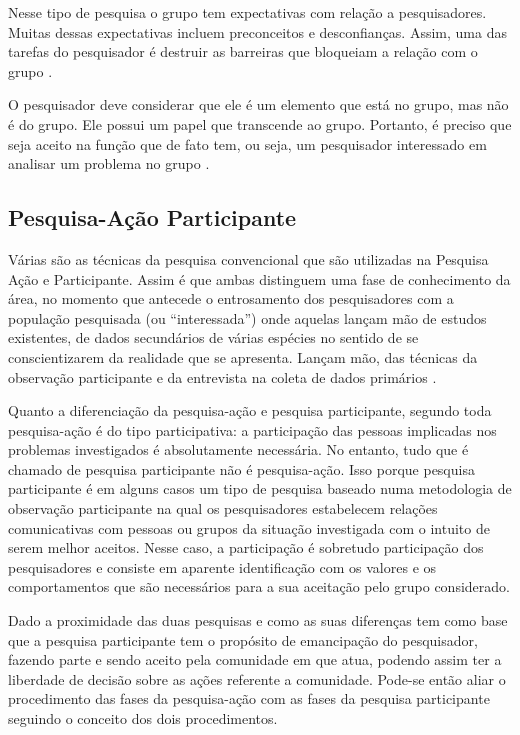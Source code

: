 Nesse tipo de pesquisa o grupo tem expectativas com relação a pesquisadores. Muitas dessas expectativas incluem preconceitos e desconfianças. Assim, uma das tarefas do pesquisador é destruir as barreiras que bloqueiam a relação com o grupo \cite{costaSantosTrevisan}.

O pesquisador deve considerar que ele é um elemento que está no grupo, mas não é do grupo. Ele possui um papel que transcende ao grupo. Portanto, é preciso que seja aceito na função que de fato tem, ou seja, um pesquisador interessado em analisar um problema no grupo \cite{costaSantosTrevisan}.

\subsection{Pesquisa-Ação Participante}

Várias são as técnicas da pesquisa convencional que são utilizadas na Pesquisa Ação e Participante. Assim é que ambas distinguem uma fase de conhecimento da área, no momento que antecede o entrosamento dos pesquisadores com a população pesquisada (ou “interessada”) onde aquelas lançam mão de estudos existentes, de dados secundários de várias espécies no sentido de se conscientizarem da realidade que se apresenta. Lançam mão, das técnicas da observação participante e da entrevista na coleta de dados primários \cite{costaSantosTrevisan}.

Quanto a diferenciação da pesquisa-ação e pesquisa participante, segundo  toda pesquisa-ação é do tipo participativa: a participação das pessoas implicadas nos problemas investigados é absolutamente necessária. No entanto, tudo que é chamado de pesquisa participante não é pesquisa-ação. Isso porque pesquisa participante é em alguns casos um tipo de pesquisa baseado numa metodologia de observação participante na qual os pesquisadores estabelecem relações comunicativas com pessoas ou grupos da situação investigada com o intuito de serem melhor aceitos. Nesse caso, a participação é sobretudo participação dos pesquisadores e consiste em aparente identificação com os valores e os comportamentos que são necessários para a sua aceitação pelo grupo considerado.

Dado a proximidade das duas pesquisas e como as suas diferenças tem como base que a pesquisa participante tem o propósito de emancipação do pesquisador, fazendo parte e sendo aceito pela comunidade em que atua, podendo assim ter a liberdade de decisão sobre as ações referente a comunidade. Pode-se então aliar o procedimento das fases da pesquisa-ação com as fases da pesquisa participante seguindo o conceito dos dois procedimentos.

